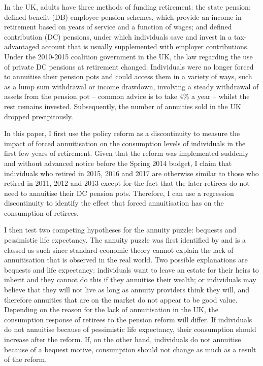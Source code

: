 \documentclass[12pt]{article}
\begin{document}
In the UK, adults have three methods of funding retirement: the state pension;
defined benefit (DB) employee pension schemes, which provide an income in
retirement based on years of service and a function of wages; and defined
contribution (DC) pensions, under which individuals save and invest in a
tax-advantaged account that is usually supplemented with employer contributions.
Under the 2010-2015 coalition government in the UK, the law regarding the use of
private DC pensions at retirement changed. Individuals were no longer forced to
annuitise their pension pots and could access them in a variety of ways, such as
a lump sum withdrawal or income drawdown, involving a steady withdrawal of
assets from the pension pot -- common advice is to take 4\% a year -- whilst the
rest remains invested. Subsequently, the number of annuities sold in the UK
dropped precipitously.

In this paper, I first use the policy reform as a discontinuity to measure the
impact of forced annuitisation on the consumption levels of individuals in the
first few years of retirement. Given that the reform was implemented suddenly
and without advanced notice before the Spring 2014 budget, I claim that
individuals who retired in 2015, 2016 and 2017 are otherwise similar to those
who retired in 2011, 2012 and 2013 except for the fact that the later retirees
do not need to annuitise their DC pension pots. Therefore, I can use a
regression discontinuity to identify the effect that forced annuitisation has on
the consumption of retirees.

I then test two competing hypotheses for the annuity puzzle: bequests and
pessimistic life expectancy. The annuity puzzle was first identified by
\cite{yaari_65} and is a classed as such since standard economic theory cannot
explain the lack of annuitisation that is observed in the real world. Two
possible explanations are bequests and life expectancy: individuals want to
leave an estate for their heirs to inherit and they cannot do this if they
annuitise their wealth; or individuals may believe that they will not live as
long as annuity providers think they will, and therefore annuities that are on
the market do not appear to be good value. Depending on the reason for the lack
of annuitisation in the UK, the consumption response of retirees to the pension
reform will differ. If individuals do not annuitise because of pessimistic life
expectancy, their consumption should increase after the reform. If, on the other
hand, individuals do not annuitise because of a bequest motive, consumption
should not change as much as a result of the reform.
\end{document}
